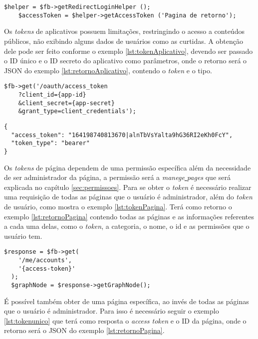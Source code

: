 \begin{lstlisting}[caption={Obtendo Token de acesso a página},label={lst:tokenUsuario}]
	$helper = $fb->getRedirectLoginHelper ();
	$accessToken = $helper->getAccessToken ('Pagina de retorno');
\end{lstlisting}

Os \textit{tokens} de aplicativos possuem limitações, restringindo o acesso a conteúdos públicos, não exibindo alguns dados de usuários como as curtidas. A obtenção dele pode ser feito conforme o exemplo \ref{lst:tokenAplicativo}, devendo ser passado o ID único e o ID secreto do aplicativo como parâmetros, onde o retorno será o JSON do exemplo \ref{lst:retornoAplicativo}, contendo o \textit{token} e o tipo.

\begin{lstlisting}[caption={Obtendo \textit{token} de acesso de aplicativos},label={lst:tokenAplicativo}]
$fb->get('/oauth/access_token
    ?client_id={app-id}
    &client_secret={app-secret}
    &grant_type=client_credentials');
\end{lstlisting}

\begin{lstlisting}[caption={Retorno \textit{token} de acesso de aplicativo \ref{lst:tokenAplicativo}},label={lst:retornoAplicativo}]
{
  "access_token": "164198740813670|alnTbVsYalta9hG36RI2eKh0FcY",
  "token_type": "bearer"
}
\end{lstlisting}

Os \textit{tokens} de página dependem de uma permissão específica além da necessidade de ser administrador da página, a permissão será a \textit{manege\underline{{ }}pages} que será explicada no capítulo \ref{sec:permissoes}. Para se obter o \textit{token} é necessário realizar uma requisição de todas as páginas que o usuário é administrador, além do \textit{token} de usuário, como mostra o exemplo \ref{lst:tokenPagina}. Terá como retorno o exemplo \ref{lst:retornoPagina} contendo todas as páginas e as informações referentes a cada uma delas, como o \textit{token}, a categoria, o nome, o id e as permissões que o usuário tem. 

\begin{lstlisting}[caption={Obtendo Token de acesso a página},label={lst:tokenPagina}]
  $response = $fb->get(
    '/me/accounts',
    '{access-token}'
  );
  $graphNode = $response->getGraphNode();
\end{lstlisting}

É possível também obter de uma página específica, ao invés de todas as páginas que o usuário é administrador. Para isso é necessário seguir o exemplo \ref{lst:tokenunico} que terá como resposta o \textit{access token} e o ID da página, onde o retorno será o JSON do exemplo \ref{lst:retornoPagina}.


